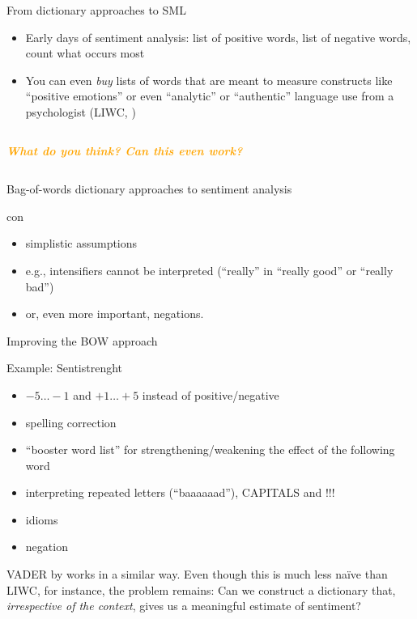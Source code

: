 \documentclass[compress]{beamer}
\newcommand{\question}[1]{
	\begin{frame}[plain]
		\begin{columns}
			\column{.3\textwidth}
			\makebox[\columnwidth]{
				\texttt{[image: mannetje.png]}}
			\column{.7\textwidth}
			\large
			\textcolor{orange}{\textbf{\emph{#1}}}
		\end{columns}
\end{frame}}
\begin{document}
\begin{frame}{From dictionary approaches to SML}
	\begin{itemize}[<+->]
		\item Early days of sentiment analysis: list of positive words, list of negative words, count what occurs most
		\item You can even \textit{buy} lists of words that are meant to measure constructs like ``positive emotions'' or even ``analytic'' or ``authentic'' language use from a psychologist (LIWC, \cite{Pennebaker2007})
	\end{itemize}
\end{frame}

\question{What do you think? Can this even work?}





\begin{frame}{Bag-of-words dictionary approaches to sentiment analysis}
	\begin{block}{con}
		\begin{itemize}
			\item simplistic assumptions
			\item e.g., intensifiers cannot be interpreted (``really'' in ``really good'' or ``really bad'')
			\item or, even more important, negations.
		\end{itemize}
	\end{block}
\end{frame}




\begin{frame}{Improving the BOW approach}
	\begin{block}{Example: Sentistrenght \parencite{Thelwall2012}}
		\begin{itemize}
			\item $-5\ldots-1$ and $+1\ldots+5$ instead of positive/negative
			\item spelling correction
			\item ``booster word list'' for strengthening/weakening the effect of the following word
			\item interpreting repeated letters (``baaaaaad''), CAPITALS and !!!
			\item idioms
			\item negation 
		\end{itemize}
	\end{block}
	
	VADER by \cite{Hutto2014} works in a similar way.
	\pause
	\footnotesize{Even though this is much less na\"ive than LIWC, for instance, the problem remains: Can we construct a dictionary that, \emph{irrespective of the context}, gives us a meaningful estimate of sentiment? }
\end{frame}
\end{document}
